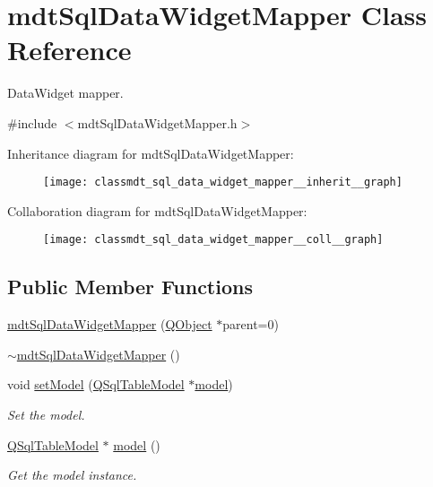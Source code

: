 \hypertarget{classmdt_sql_data_widget_mapper}{\section{mdt\-Sql\-Data\-Widget\-Mapper Class Reference}
\label{classmdt_sql_data_widget_mapper}
}


Data\-Widget mapper.  




{\ttfamily \#include $<$mdt\-Sql\-Data\-Widget\-Mapper.\-h$>$}



Inheritance diagram for mdt\-Sql\-Data\-Widget\-Mapper\-:\nopagebreak
\begin{figure}[H]
\begin{center}
\leavevmode
\texttt{[image: classmdt\_sql\_data\_widget\_mapper\_\_inherit\_\_graph]}
\end{center}
\end{figure}


Collaboration diagram for mdt\-Sql\-Data\-Widget\-Mapper\-:\nopagebreak
\begin{figure}[H]
\begin{center}
\leavevmode
\texttt{[image: classmdt\_sql\_data\_widget\_mapper\_\_coll\_\_graph]}
\end{center}
\end{figure}
\subsection*{Public Member Functions}
\begin{DoxyCompactItemize}
\item 
\hyperlink{classmdt_sql_data_widget_mapper_a526266b947f0a787e28b48976bfe3d91}{mdt\-Sql\-Data\-Widget\-Mapper} (\hyperlink{class_q_object}{Q\-Object} $\ast$parent=0)
\item 
\hyperlink{classmdt_sql_data_widget_mapper_a0de27996243693391034fc5833b3a1ad}{$\sim$mdt\-Sql\-Data\-Widget\-Mapper} ()
\item 
void \hyperlink{classmdt_sql_data_widget_mapper_ae32a335edcb2bb37bf86f1f59874a1f4}{set\-Model} (\hyperlink{class_q_sql_table_model}{Q\-Sql\-Table\-Model} $\ast$\hyperlink{classmdt_sql_data_widget_mapper_adc6e8948ea3c0e81a35955b516770734}{model})
\begin{DoxyCompactList}\small\item\em Set the model. \end{DoxyCompactList}\item 
\hyperlink{class_q_sql_table_model}{Q\-Sql\-Table\-Model} $\ast$ \hyperlink{classmdt_sql_data_widget_mapper_adc6e8948ea3c0e81a35955b516770734}{model} ()
\begin{DoxyCompactList}\small\item\em Get the model instance. \end{DoxyCompactList}\end{DoxyCompactItemize}


